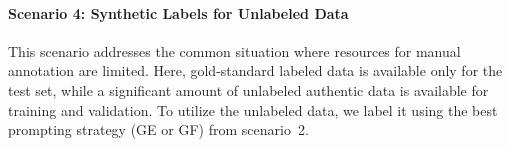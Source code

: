 \paragraph{Scenario 4: Synthetic Labels for Unlabeled Data} \label{s:m:sc4}

This scenario addresses the common situation where resources for manual annotation are limited. Here, gold-standard labeled data is available only for the test set, while a significant amount of unlabeled authentic data is available for training and validation.
To utilize the unlabeled data, we label it using the best prompting strategy (GE or GF) from scenario~2.

       
